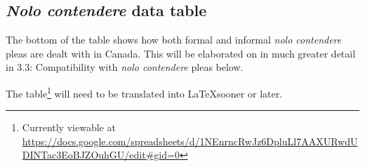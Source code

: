 \newpage
\subsection{\textit{Nolo contendere} data table}

The bottom of the table shows how both formal and informal \textit{nolo contendere} pleas are dealt with in Canada. This will be elaborated on in much greater detail in 3.3: Compatibility with \textit{nolo contendere} pleas below.

The table\footnote{Currently viewable at \url{https://docs.google.com/spreadsheets/d/1NEnrncRwJz6DpluLl7AAXURwdUDINTac3EoBJZOuhGU/edit\#gid=0}} will need to be translated into \LaTeX  sooner or later.